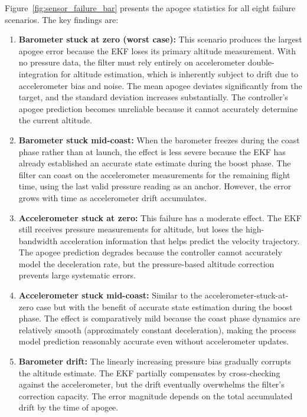 \documentclass[11pt,letterpaper]{article}
\begin{document}
Figure~\ref{fig:sensor_failure_bar} presents the apogee statistics for all eight failure scenarios. The key findings are:

\begin{enumerate}[nosep]
    \item \textbf{Barometer stuck at zero (worst case):} This scenario produces the largest apogee error because the EKF loses its primary altitude measurement. With no pressure data, the filter must rely entirely on accelerometer double-integration for altitude estimation, which is inherently subject to drift due to accelerometer bias and noise. The mean apogee deviates significantly from the target, and the standard deviation increases substantially. The controller's apogee prediction becomes unreliable because it cannot accurately determine the current altitude.

    \item \textbf{Barometer stuck mid-coast:} When the barometer freezes during the coast phase rather than at launch, the effect is less severe because the EKF has already established an accurate state estimate during the boost phase. The filter can coast on the accelerometer measurements for the remaining flight time, using the last valid pressure reading as an anchor. However, the error grows with time as accelerometer drift accumulates.

    \item \textbf{Accelerometer stuck at zero:} This failure has a moderate effect. The EKF still receives pressure measurements for altitude, but loses the high-bandwidth acceleration information that helps predict the velocity trajectory. The apogee prediction degrades because the controller cannot accurately model the deceleration rate, but the pressure-based altitude correction prevents large systematic errors.

    \item \textbf{Accelerometer stuck mid-coast:} Similar to the accelerometer-stuck-at-zero case but with the benefit of accurate state estimation during the boost phase. The effect is comparatively mild because the coast phase dynamics are relatively smooth (approximately constant deceleration), making the process model prediction reasonably accurate even without accelerometer updates.

    \item \textbf{Barometer drift:} The linearly increasing pressure bias gradually corrupts the altitude estimate. The EKF partially compensates by cross-checking against the accelerometer, but the drift eventually overwhelms the filter's correction capacity. The error magnitude depends on the total accumulated drift by the time of apogee.


\end{enumerate}
\end{document}
